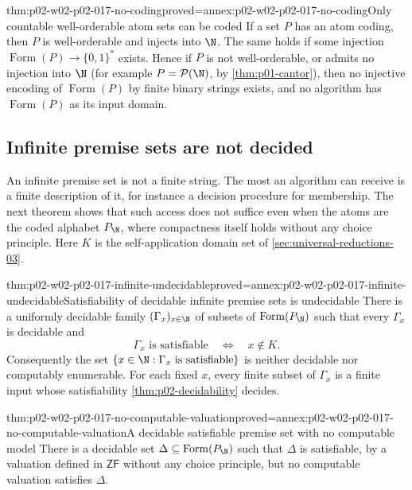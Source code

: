 \begin{hblemma}{thm:p02-w02-p02-017-no-coding}{proved=annex:p02-w02-p02-017-no-coding}{Only countable well-orderable atom sets can be coded}
If a set \(P\) has an atom coding, then \(P\) is well-orderable and
injects into \(\N\).  The same holds if some injection
\(\operatorname{Form}(P)\to\{0,1\}^{*}\) exists.  Hence if \(P\) is not
well-orderable, or admits no injection into \(\N\) (for example
\(P=\mathcal P(\N)\), by \cref{thm:p01-cantor}), then no injective
encoding of \(\operatorname{Form}(P)\) by finite binary strings exists,
and no algorithm has \(\operatorname{Form}(P)\) as its input domain.
\end{hblemma}

\subsection{Infinite premise sets are not decided}
\label{sec:p02-w02-p02-017-infinite-premises}

An infinite premise set is not a finite string.  The most an algorithm
can receive is a finite description of it, for instance a decision
procedure for membership.  The next theorem shows that such access does
not suffice even when the atoms are the coded alphabet \(P_{\N}\), where
compactness itself holds without any choice principle.  Here \(K\) is the
self-application domain set of \cref{sec:universal-reductions-03}.

\begin{hbtheorem}{thm:p02-w02-p02-017-infinite-undecidable}{proved=annex:p02-w02-p02-017-infinite-undecidable}{Satisfiability of decidable infinite premise sets is undecidable}
There is a uniformly decidable family \((\Gamma_x)_{x\in\N}\) of subsets
of \(\operatorname{Form}(P_{\N})\) such that every \(\Gamma_x\) is decidable and
\[
 \Gamma_x\text{ is satisfiable}\quad\Longleftrightarrow\quad x\notin K .
\]
Consequently the set \(\{x\in\N:\Gamma_x\text{ is satisfiable}\}\) is
neither decidable nor computably enumerable.  For each fixed \(x\), every
finite subset of \(\Gamma_x\) is a finite input whose satisfiability
\cref{thm:p02-decidability} decides.
\end{hbtheorem}

\begin{hbtheorem}{thm:p02-w02-p02-017-no-computable-valuation}{proved=annex:p02-w02-p02-017-no-computable-valuation}{A decidable satisfiable premise set with no computable model}
There is a decidable set \(\Delta\subseteq\operatorname{Form}(P_{\N})\) such that
\(\Delta\) is satisfiable, by a valuation defined in \(\mathsf{ZF}\)
without any choice principle, but no computable valuation satisfies
\(\Delta\).
\end{hbtheorem}

